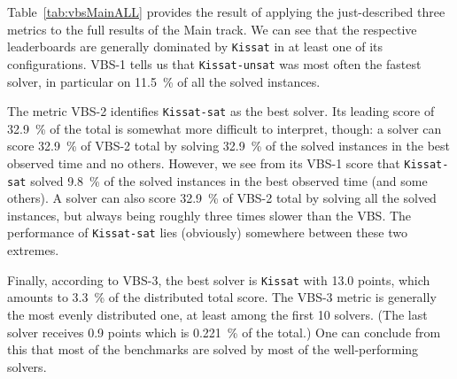 \documentclass{elsarticle}
\newcommand{\todo}[1]{{\color{purple}Todo: #1}}
\newcommand{\solver}[1]{\texttt{#1}}
\begin{document}

Table~\ref{tab:vbsMainALL} provides the result of applying the just-described three metrics 
to the full results of the Main track. We can see that the respective leaderboards 
are generally dominated by \solver{Kissat} in at least one of its configurations.
VBS-1 tells us that \solver{Kissat-unsat} was most often the fastest solver,
in particular on \SI{11.5}{\percent} of all the solved instances.

The metric VBS-2 identifies \solver{Kissat-sat} as the best solver. Its leading score of \SI{32.9}{\percent} of the total
is somewhat more difficult to interpret, though: a solver can score \SI{32.9}{\percent} of VBS-2 total
by solving \SI{32.9}{\percent} of the solved instances in the best observed time
and no others. However, we see from its VBS-1 score that \solver{Kissat-sat} solved \SI{9.8}{\percent}
of the solved instances in the best observed time (and some others).
A solver can also score \SI{32.9}{\percent} of VBS-2 total by solving all the solved instances,
but always being roughly three times slower than the VBS. 
The performance of \solver{Kissat-sat} lies (obviously) somewhere between these two extremes.

Finally, according to VBS-3, the best solver is \solver{Kissat} with 13.0 points,
which amounts to \SI{3.3}{\percent} of the distributed total score.
The VBS-3 metric is generally the most evenly distributed one,
at least among the first 10 solvers. 
(The last solver receives 0.9 points which is \SI{0.221}{\percent} of the total.)
One can conclude from this that most of the benchmarks are solved
by most of the well-performing solvers. 
\end{document}
